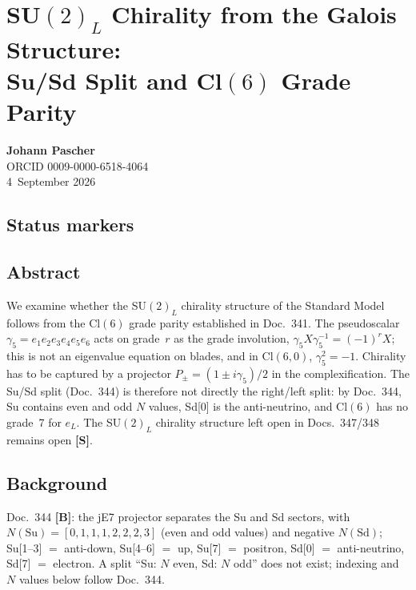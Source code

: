 \providecommand{\BM}{\textbf{[B]}}\providecommand{\KM}{\textbf{[K]}}\providecommand{\SM}{\textbf{[S]}}
\chapter*{SU$(2)_L$ Chirality from the Galois Structure:\\
Su/Sd Split and Cl$(6)$ Grade Parity}
\begin{center}\large\textbf{Johann Pascher}\\\normalsize ORCID 0009-0000-6518-4064\\4~September 2026\end{center}

\section*{Status markers}

\section*{Abstract}
We examine whether the SU$(2)_L$ chirality structure of the Standard Model follows from the Cl$(6)$ grade parity established in Doc.~341. The pseudoscalar $\gamma_5=e_1e_2e_3e_4e_5e_6$ acts on grade~$r$ as the grade involution, $\gamma_5 X\gamma_5^{-1}=(-1)^r X$; this is not an eigenvalue equation on blades, and in Cl$(6,0)$, $\gamma_5^2=-1$. Chirality has to be captured by a projector $P_\pm=(1\pm i\gamma_5)/2$ in the complexification. The Su/Sd split (Doc.~344) is therefore not directly the right/left split: by Doc.~344, Su contains even and odd $N$ values, Sd[0] is the anti-neutrino, and Cl$(6)$ has no grade~7 for $e_L$. The SU$(2)_L$ chirality structure left open in Docs.~347/348 remains open \SM.
\section*{Background}
Doc.~344 \BM: the jE7 projector separates the Su and Sd sectors, with $N(\mathrm{Su})=[0,1,1,1,2,2,2,3]$ (even and odd values) and negative $N(\mathrm{Sd})$; Su[1--3] $=$ anti-down, Su[4--6] $=$ up, Su[7] $=$ positron, Sd[0] $=$ anti-neutrino, Sd[7] $=$ electron. A split ``Su: $N$ even, Sd: $N$ odd'' does not exist; indexing and $N$ values below follow Doc.~344.
